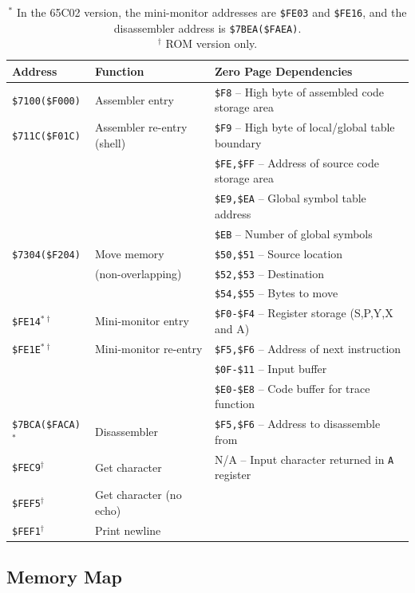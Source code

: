 \documentclass[12pt]{article}
\begin{document}
\begin{table}[htb]
	\centering
	\begin{tabular}{|l|l|l|} \hline
	\textbf{Address} & \textbf{Function} & \textbf{Zero Page Dependencies} \tabularnewline\hline
	\texttt{\$7100(\$F000)} & Assembler entry & 
		\texttt{\$F8} -- High byte of assembled code storage area \tabularnewline
	\texttt{\$711C(\$F01C)} & Assembler re-entry (shell) & 
		\texttt{\$F9} -- High byte of local/global table boundary \tabularnewline
		& & \texttt{\$FE,\$FF} -- Address of source code storage area \tabularnewline
		& & \texttt{\$E9,\$EA} -- Global symbol table address \tabularnewline
		& & \texttt{\$EB} -- Number of global symbols \tabularnewline\hline

	\texttt{\$7304(\$F204)} & Move memory & 
		\texttt{\$50,\$51} -- Source location \tabularnewline
		& (non-overlapping) & \texttt{\$52,\$53} -- Destination \tabularnewline
		& & \texttt{\$54,\$55} -- Bytes to move \tabularnewline\hline
		
	\texttt{\$FE14}$^{*\dagger}$ & Mini-monitor entry & \texttt{\$F0-\$F4} -- Register storage (S,P,Y,X and A)  \tabularnewline
	\texttt{\$FE1E}$^{*\dagger}$ & Mini-monitor re-entry & \texttt{\$F5,\$F6} -- Address of next instruction \tabularnewline
	 & & \texttt{\$0F-\$11} -- Input buffer \tabularnewline
	 & & \texttt{\$E0-\$E8} -- Code buffer for trace function \tabularnewline\hline
	 
	\texttt{\$7BCA(\$FACA)$^{*}$} & Disassembler & \texttt{\$F5,\$F6} -- Address to disassemble from \tabularnewline
	\hline
	\texttt{\$FEC9}$^{\dagger}$ & Get character \newline & N/A -- Input character returned in \texttt{A} register \tabularnewline
	\texttt{\$FEF5}$^{\dagger}$ & Get character (no echo) & \tabularnewline
	\texttt{\$FEF1}$^{\dagger}$ & Print newline & \tabularnewline
	\hline
	\end{tabular}
	\caption{Important function entry points and related memory locations.}
	\caption*{
	$^{*}$ In the 65C02 version, the mini-monitor addresses are \texttt{\$FE03} and \texttt{\$FE16}, and
	the disassembler address is \texttt{\$7BEA(\$FAEA)}. \\
	$^{\dagger}$ ROM version only.
	}
	\label{tab:memlocs}
\end{table}

\subsection{Memory Map}
\label{sec:memory}
\end{document}
